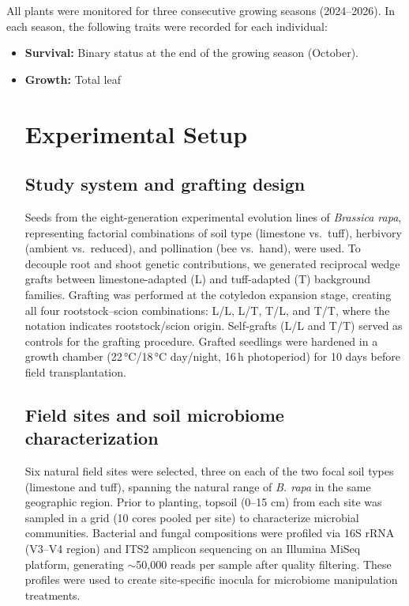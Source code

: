 \documentclass{article}
\begin{document}
All plants were monitored for three consecutive growing seasons (2024–2026). In each season, the following traits were recorded for each individual:
\begin{itemize}
    \item \textbf{Survival:} Binary status at the end of the growing season (October).
    \item \textbf{Growth:} Total leaf

\section{Experimental Setup}

\subsection{Study system and grafting design}
Seeds from the eight-generation experimental evolution lines of \textit{Brassica rapa}, representing factorial combinations of soil type (limestone vs.\ tuff), herbivory (ambient vs.\ reduced), and pollination (bee vs.\ hand), were used. To decouple root and shoot genetic contributions, we generated reciprocal wedge grafts between limestone-adapted (L) and tuff-adapted (T) background families. Grafting was performed at the cotyledon expansion stage, creating all four rootstock--scion combinations: L/L, L/T, T/L, and T/T, where the notation indicates rootstock/scion origin. Self‑grafts (L/L and T/T) served as controls for the grafting procedure. Grafted seedlings were hardened in a growth chamber (22\,°C/18\,°C day/night, 16\,h photoperiod) for 10 days before field transplantation.

\subsection{Field sites and soil microbiome characterization}
Six natural field sites were selected, three on each of the two focal soil types (limestone and tuff), spanning the natural range of \textit{B. rapa} in the same geographic region. Prior to planting, topsoil (0--15 cm) from each site was sampled in a grid (10 cores pooled per site) to characterize microbial communities. Bacterial and fungal compositions were profiled via 16S rRNA (V3--V4 region) and ITS2 amplicon sequencing on an Illumina MiSeq platform, generating \(\sim\)50,000 reads per sample after quality filtering. These profiles were used to create site‑specific inocula for microbiome manipulation treatments.


\end{itemize}
\end{document}
